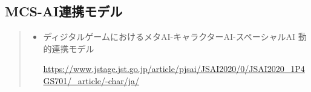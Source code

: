 \documentclass{jarticle}     %
\begin{document}
 \subsection*{MCS-AI連携モデル}
 
 \begin{quote}
  \begin{itemize}
   \item  ディジタルゲームにおけるメタAI-キャラクターAI-スペーシャルAI 動的連携モデル\par
   \url{https://www.jstage.jst.go.jp/article/pjsai/JSAI2020/0/JSAI2020_1P4GS701/_article/-char/ja/}
  \end{itemize}
 \end{quote}






\par







\end{document}
